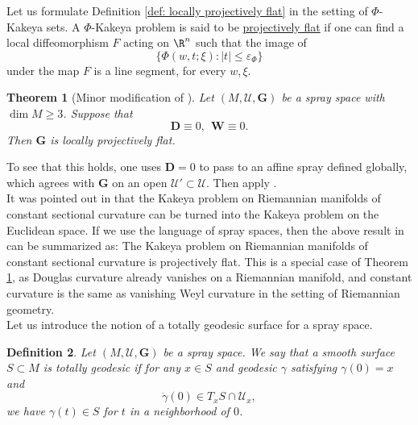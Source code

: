 \documentclass{article}
\newcommand{\bG}{\mathbf{G}}
\numberwithin{equation}{section}
\theoremstyle{plain}
\newtheorem{theorem}{Theorem}[section]
\newtheorem{definition}[theorem]{Definition}
\begin{document}
Let us formulate Definition \ref{def: locally projectively flat} in the setting of $\Phi$-Kakeya sets. A $\Phi$-Kakeya problem is said to be \underline{projectively flat} if 
one can find a local diffeomorphism $F$ acting on $\R^n$ such that 
the image of 
\begin{equation}
\{\Phi(w, t; \xi): |t|\le \varepsilon_{\Phi}\}
\end{equation}
under the map $F$ is a line segment, for every $w, \xi$. 


\begin{theorem}[Minor modification of ]\label{thm: douglas weyl vanishing}
    Let $(M, \mathcal U, \bG)$ be a spray space with $\dim M \geq 3$. Suppose that  
    \begin{equation}
    \mathbf{D}\equiv 0, \ \  \mathbf{W} \equiv 0.
    \end{equation}
     Then $\bG$ is locally projectively flat.
\end{theorem}
To see that this holds, one uses $\mathbf D = 0$ to pass to an affine spray defined globally, which agrees with $\bG$ on an open $\mathcal U' \subset \mathcal U$. Then apply \cite[Theorem 13.5.1]{Shen01}.\\


It was pointed out in \cite{gao2025curvedkakeyasetsnikodym} that 
the Kakeya problem on Riemannian manifolds of constant sectional curvature can be turned into the Kakeya problem on the Euclidean space. If we use the language of spray spaces, then  the above result in \cite{gao2025curvedkakeyasetsnikodym} can be summarized as: The Kakeya problem on Riemannian manifolds of constant sectional curvature is projectively flat. This is a special case of Theorem \ref{thm: douglas weyl vanishing}, as Douglas curvature already vanishes on a Riemannian manifold, and constant curvature is the same as vanishing Weyl curvature in the setting of Riemannian geometry. \\



Let us introduce the notion of a totally geodesic surface for a spray space. 
\begin{definition}\label{def: totally geodesic surface}
    Let $(M, \mathcal U, \bG)$ be a spray space. We say that a smooth surface $S \subset M$ is totally geodesic if for any $x \in S$ and geodesic $\gamma$ satisfying $\gamma(0) = x$ and
    \begin{equation}
    \dot \gamma(0) \in T_x S \cap \mathcal U_x,
    \end{equation}
     we have $\gamma(t) \in S$ for $t$ in a neighborhood of $0$. 
\end{definition}
\end{document}

